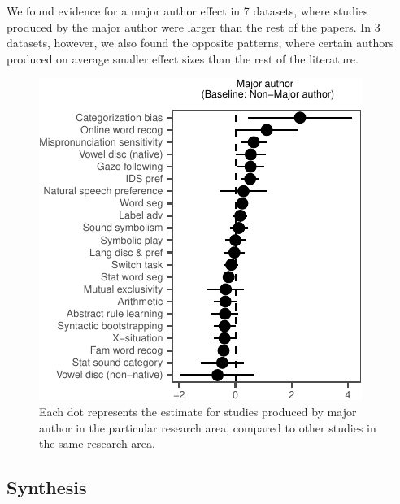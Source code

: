 \documentclass[10pt, letterpaper]{article}
\newenvironment{CodeChunk}{}{}
\begin{document}
We found evidence for a major author effect in 7 datasets, where studies
produced by the major author were larger than the rest of the papers. In
3 datasets, however, we also found the opposite patterns, where certain
authors produced on average smaller effect sizes than the rest of the
literature.

\begin{CodeChunk}
\begin{figure}[H]

{\centering \includegraphics{figs/image-1} 

}

\caption[Each dot represents the estimate for studies produced by major author in the particular research area, compared to other studies in the same research area]{Each dot represents the estimate for studies produced by major author in the particular research area, compared to other studies in the same research area.}\label{fig:image}
\end{figure}
\end{CodeChunk}

\hypertarget{synthesis}{%
\subsection{Synthesis}\label{synthesis}}
\end{document}
